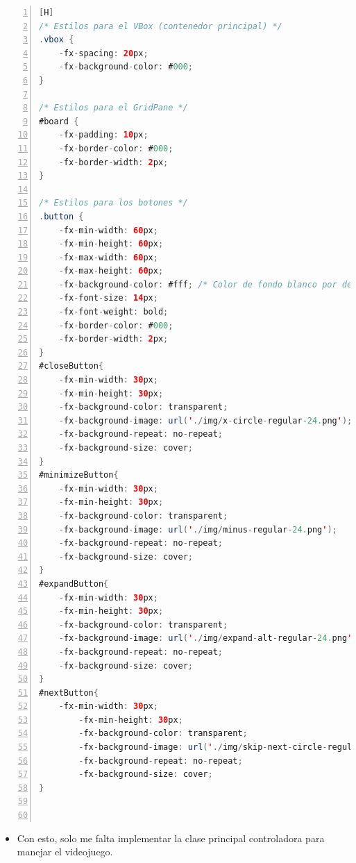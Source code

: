 \documentclass{article}
\begin{document}
	\begin{lstlisting}[language=java,caption={Style.css}, numbers=left][H]
/* Estilos para el VBox (contenedor principal) */
.vbox {
    -fx-spacing: 20px;
    -fx-background-color: #000;
}

/* Estilos para el GridPane */
#board {
    -fx-padding: 10px;
    -fx-border-color: #000;
    -fx-border-width: 2px;
}

/* Estilos para los botones */
.button {
    -fx-min-width: 60px;
    -fx-min-height: 60px;
    -fx-max-width: 60px;
    -fx-max-height: 60px;
    -fx-background-color: #fff; /* Color de fondo blanco por defecto */
    -fx-font-size: 14px;
    -fx-font-weight: bold;
    -fx-border-color: #000;
    -fx-border-width: 2px;
}
#closeButton{
    -fx-min-width: 30px;
    -fx-min-height: 30px;
    -fx-background-color: transparent;
    -fx-background-image: url('./img/x-circle-regular-24.png');
    -fx-background-repeat: no-repeat;
    -fx-background-size: cover;
}
#minimizeButton{
    -fx-min-width: 30px;
    -fx-min-height: 30px;
    -fx-background-color: transparent;
    -fx-background-image: url('./img/minus-regular-24.png');
    -fx-background-repeat: no-repeat;
    -fx-background-size: cover;
}
#expandButton{
    -fx-min-width: 30px;
    -fx-min-height: 30px;
    -fx-background-color: transparent;
    -fx-background-image: url('./img/expand-alt-regular-24.png');
    -fx-background-repeat: no-repeat;
    -fx-background-size: cover;
}
#nextButton{
    -fx-min-width: 30px;
        -fx-min-height: 30px;
        -fx-background-color: transparent;
        -fx-background-image: url('./img/skip-next-circle-regular-24.png');
        -fx-background-repeat: no-repeat;
        -fx-background-size: cover;
}



	\end{lstlisting}	
	\begin{itemize}	
		\item Con esto, solo me falta implementar la clase principal controladora para manejar el videojuego.
	\end{itemize}
	
\end{document}
